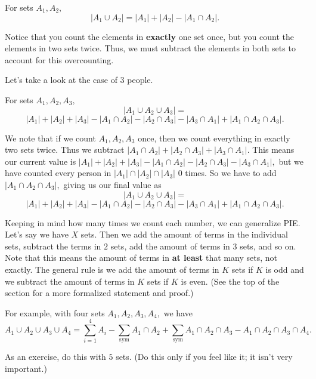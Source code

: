 \documentclass[blue,onecol]{shooting}
\begin{document}
\begin{theo}
For sets $A_1,A_2,$
\[|A_1\cup A_2|=|A_1|+|A_2|-|A_1\cap A_2|.\]
\end{theo}

\begin{pro}
Notice that you count the elements in \textbf{exactly} one set once, but you count the elements in two sets twice. Thus, we must subtract the elements in both sets to account for this overcounting.
\end{pro}

Let's take a look at the case of $3$ people.

\begin{theo}
For sets $A_1,A_2,A_3,$
\[|A_1\cup A_2\cup A_3|=\]
\[|A_1|+|A_2|+|A_3|-|A_1\cap A_2|-|A_2\cap A_3|- |A_3\cap A_1|+|A_1\cap A_2\cap A_3|.\]
\end{theo}

\begin{pro}
We note that if we count $A_1,A_2,A_3$ once, then we count everything in exactly two sets twice. Thus we subtract $|A_1\cap A_2|+|A_2\cap A_3|+|A_3\cap A_1|.$ This means our current value is $|A_1|+|A_2|+|A_3|-|A_1\cap A_2|-|A_2\cap A_3|- |A_3\cap A_1|,$ but we have counted every person in $|A_1|\cap |A_2|\cap |A_3|$ $0$ times. So we have to add $|A_1\cap A_2\cap A_3|,$ giving us our final value as
$$|A_1\cup A_2\cup A_3|=$$
$$|A_1|+|A_2|+|A_3|-|A_1\cap A_2|-|A_2\cap A_3|- |A_3\cap A_1|+|A_1\cap A_2\cap A_3|.$$
\end{pro}

Keeping in mind how many times we count each number, we can generalize PIE. Let's say we have $X$ sets. Then we add the amount of terms in the individual sets, subtract the terms in $2$ sets, add the amount of terms in $3$ sets, and so on. Note that this means the amount of terms in \textbf{at least} that many sets, not exactly. The general rule is we add the amount of terms in $K$ sets if $K$ is odd and we subtract the amount of terms in $K$ sets if $K$ is even. (See the top of the section for a more formalized statement and proof.)

For example, with four sets $A_1,A_2,A_3,A_4,$ we have $$A_1\cup A_2\cup A_3\cup A_4=\sum\limits_{i=1}^{4}A_i-\sum\limits_{\text{sym}}A_1\cap A_2+\sum\limits_{\text{sym}}A_1\cap A_2\cap A_3-A_1\cap A_2\cap A_3 \cap A_4.$$

As an exercise, do this with $5$ sets. (Do this only if you feel like it; it isn't very important.)
\end{document}
